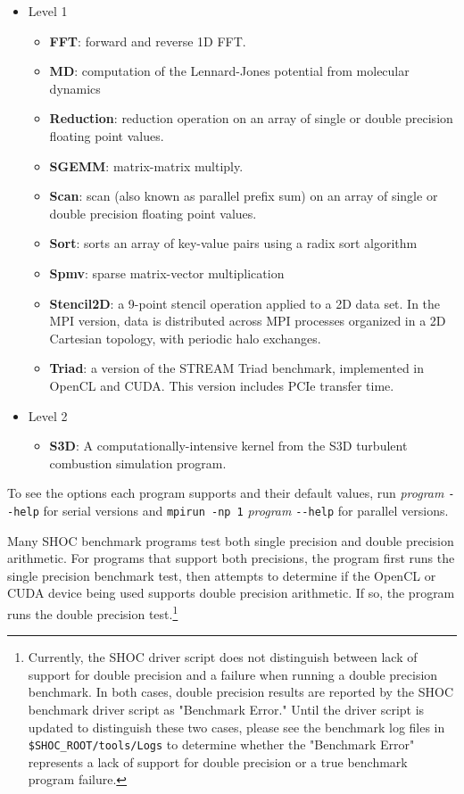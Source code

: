\documentclass[11pt]{article}
\begin{document}
\begin{itemize}
\item Level 1
    \begin{itemize}
        \item {\bf FFT}: forward and reverse 1D FFT.
        \item {\bf MD}: computation of the Lennard-Jones potential from
        molecular dynamics
        \item {\bf Reduction}: reduction operation on an array of single
        or double precision floating point values.
        \item {\bf SGEMM}: matrix-matrix multiply.
        \item {\bf Scan}: scan (also known as parallel prefix sum) on an array 
        of single or double precision floating point values.
        \item {\bf Sort}: sorts an array of key-value pairs using a radix sort 
        algorithm
        \item {\bf Spmv}: sparse matrix-vector multiplication
        \item {\bf Stencil2D}: a 9-point stencil operation applied to a 2D data
        set. In the MPI version, data is distributed across MPI processes
        organized in a 2D Cartesian topology, with periodic halo exchanges.
        \item {\bf Triad}: a version of the STREAM Triad benchmark, implemented 
        in OpenCL and CUDA. This version includes PCIe transfer time.
    \end{itemize}
\item{Level 2}
    \begin{itemize}
        \item {\bf S3D}: A computationally-intensive kernel from the 
        S3D turbulent combustion simulation program\cite{s3d}.
    \end{itemize}
\end{itemize}
    
To see the options each program supports and their default values, run 
{\it program} \verb+--help+ for serial versions and \verb+mpirun -np 1+ {\it program} \verb+--help+
for parallel versions.

Many SHOC benchmark programs test both single precision and double precision
arithmetic.
For programs that support both precisions, the program first runs the
single precision benchmark test, then attempts to determine if the 
OpenCL or CUDA device being used supports double precision arithmetic.
If so, the program runs the double precision test.\footnote{ Currently,
the SHOC driver script does not distinguish between lack of support for 
double precision and a failure when running a double precision benchmark.
In both cases, double precision results are reported by the SHOC
benchmark driver script as "Benchmark Error."  
Until the driver script is updated to distinguish these two cases, please see
the benchmark log files in {\tt \$SHOC\_ROOT/tools/Logs} to determine whether
the "Benchmark Error" represents a lack of support for double precision 
or a true benchmark program failure.}
\end{document}
